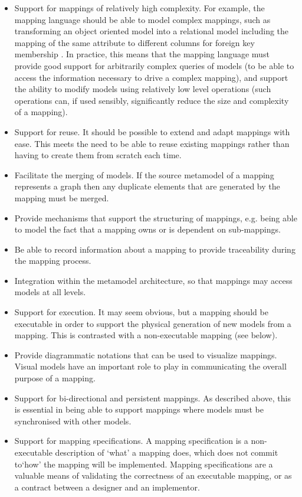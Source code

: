 \begin{itemize}
\item Support for mappings of relatively high complexity. For
example, the mapping language should be able to model complex
mappings, such as transforming an object oriented model into a
relational model including the mapping of the same attribute to
different columns for foreign key membership \cite{qvtrfp}. In
practice, this means that the mapping language must provide good
support for arbitrarily complex queries of models (to be able to
access the information necessary to drive a complex mapping), and
support the ability to modify models  using relatively low level
operations (such operations can, if used sensibly, significantly
reduce the size and complexity of a mapping).

\item Support for reuse. It should be possible to extend and adapt
mappings with ease. This meets the need to be able to reuse
existing mappings rather than having to create them from scratch
each time.

\item Facilitate the merging of models. If the source metamodel of
a mapping represents a graph then any duplicate elements that are
generated by the mapping must be merged.

\item Provide mechanisms that support the structuring of mappings, e.g.
being able to model the fact that a mapping owns or is dependent
on sub-mappings.

\item Be able to record information about a mapping to provide
traceability during the mapping process.

\item Integration within the metamodel architecture, so that
mappings may access models at all levels.

\item Support for execution. It may seem obvious, but a mapping
should be executable in order to support the physical generation
of new models from a mapping. This is contrasted with a
non-executable mapping (see below).

\item Provide diagrammatic notations that can be used to visualize
mappings. Visual models have an important role to play in
communicating the overall purpose of a mapping.

\item Support for bi-directional and persistent mappings. As described
above, this is essential in being able to support mappings where
models must be synchronised with other models.

\item Support for mapping specifications. A mapping specification
is a non-executable description of `what' a mapping does, which
does not commit to`how' the mapping will be implemented. Mapping
specifications are a valuable means of validating the correctness
of an executable mapping, or as a contract between a designer and
an implementor.
\end{itemize}

